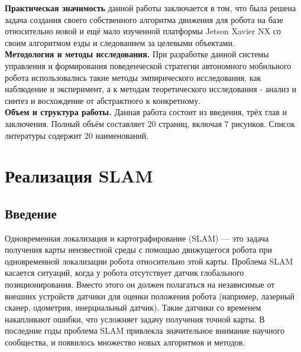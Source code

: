\documentclass[12pt,a4paper]{scrartcl}
\begin{document}
			\textbf{Практическая значимость} данной работы заключается в том, что была решена задача создания своего собственного алгоритма движения для робота на базе относительно новой и ещё мало изученной платформы Jetson Xavier NX со своим алгоритмом езды и следованием за целевыми объектами. \\ 
			
			\textbf{Методология и методы исследования.} При разработке данной системы управления и формирования поведенческой стратегии автономного мобильного робота использовались такие методы эмпирического исследования, как наблюдение и эксперимент, а к методам теоретического исследования - анализ и синтез и восхождение от абстрактного к конкретному. \\
			
			\textbf{Объем и структура работы.} Данная работа состоит из введения, трёх глав и заключения. Полный объём составляет 20 страниц, включая 7 рисунков. Список литературы содержит 20 наименований. \\
			
		\section{Реализация SLAM} \label{sec:slam}
			\subsection{Введение}
				Одновременная локализация и картографирование (SLAM) — это задача получения карты неизвестной среды с помощью движущегося робота при одновременной локализации робота относительно этой карты. Проблема SLAM касается ситуаций, когда у робота отсутствует датчик глобального позиционирования. Вместо этого он должен полагаться на независимые от внешних устройств датчики для оценки положения робота (например, лазерный сканер, одометрия, инерциальный датчик). Такие датчики со временем накапливают ошибки, что усложняет задачу получения точной карты. В последние годы проблема SLAM привлекла значительное внимание научного сообщества, и появилось множество новых алгоритмов и методов\cite{bib:Thrun2004SimultaneousLA}.
\end{document}
